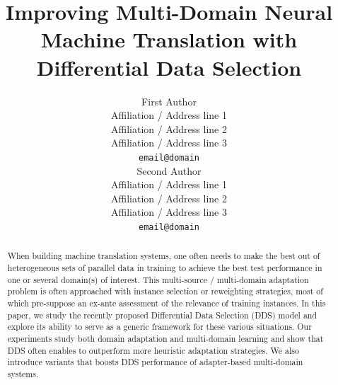 \documentclass[11pt,a4paper]{article}
\title{Improving Multi-Domain Neural Machine Translation with Differential Data Selection}
\author{First Author \\
  Affiliation / Address line 1 \\
  Affiliation / Address line 2 \\
  Affiliation / Address line 3 \\
  \texttt{email@domain} \\\And
  Second Author \\
  Affiliation / Address line 1 \\
  Affiliation / Address line 2 \\
  Affiliation / Address line 3 \\
  \texttt{email@domain} \\}
\date{}
\newcommand{\fyTodo}[1]{\Todo[FY:]{\textcolor{orange}{#1}}}
\begin{document}
\maketitle
\begin{abstract}
  When building machine translation systems, one often needs to make the best out of heterogeneous sets of parallel data in training to achieve the best test performance in one or several domain(s) of interest. This multi-source / multi-domain adaptation problem is often approached with instance selection or reweighting strategies, most of which pre-suppose an ex-ante assessment of the relevance of training instances. In this paper, we study the recently proposed Differential Data Selection (DDS) model and explore its ability to serve as a generic framework for these various situations. Our experiments study both domain adaptation and multi-domain learning and show that DDS often enables to outperform more heuristic adaptation strategies. We also introduce variants that boosts DDS performance of adapter-based multi-domain systems.\fyTodo{Keep this part ?}

\end{abstract}
\end{document}
